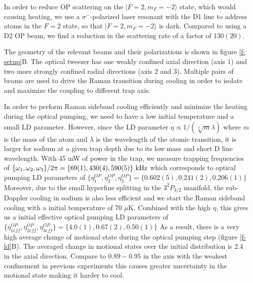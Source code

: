 \documentclass[aps,prl,twocolumn,groupedaddress]{revtex4-1}
\newcommand{\eff}{ef\! f}
\begin{document}
In order to reduce OP scattering on the $|F=2, m_F=-2\rangle$ state, which would causing heating, we use a $\sigma^-$-polarized laser resonant with the D1 line to address atoms in the $F=2$ state, so that $|F=2, m_F=-2\rangle$ is dark.  Compared to using a D2 OP beam, we find a reduction in the scattering rate of a factor of $130(20)$.


The geometry of the relevant beams and their polarizations is shown in figure \ref{f-setup}B.
The optical tweezer has one weakly confined axial direction (axis $1$) and
two more strongly confined radial directions (axis $2$ and $3$).
Multiple pairs of beams are used to drive the Raman transition during cooling in order to
isolate and maximize the coupling to different trap axis.

In order to perform Raman sideband cooling efficiently and minimize
the heating during the optical pumping, we need to have a low initial temperature and
a small LD parameter. However, since the LD parameter $\eta\propto 1/(\sqrt[4]{m}\lambda)$ where $m$ is the mass of the atom and $\lambda$
is the wavelength of the atomic transition,
it is larger for sodium at a given trap depth due to its low mass and short D line wavelength.
With 45 mW of power in the trap, we measure trapping frequencies of
$\{\omega_1,\omega_2,\omega_3\}/2\pi = \{69(1), 430(4), 590(5)\}\ \text{\text{kHz}}$
which corresponds to optical pumping LD parameters of
$\{\eta^{OP}_1,\eta^{OP}_2,\eta^{OP}_3\} = \{0.602(5), 0.241(2), 0.206(1)\}$
Moreover, due to the small hyperfine splitting in the $3^2P_{3/2}$ manifold,
the sub-Doppler cooling in sodium is also less efficient and we start the
Raman sideband cooling with a initial temperature of 70 $\mu$K. Combined with the high $\eta$, this gives us a initial effective optical pumping LD parameters of
$\{\eta^{OP}_{1\eff},\eta^{OP}_{2\eff},\eta^{OP}_{3\eff}\} = \{4.0(1), 0.67(2), 0.50(1)\}$
As a result, there is a very high average change of motional state during the optical pumping step
(figure \ref{f-ld}B). The averaged change in motional states over the initial distribution
is $2.4$ in the axial direction.
Compare to $0.89-0.95$ in the axis with the weakest confinement in previous experiments
\cite{Thompson2013,Kaufman2012,Li2012,Liu2017} this causes greater uncertainty in the motional
state making it harder to cool.
\end{document}
